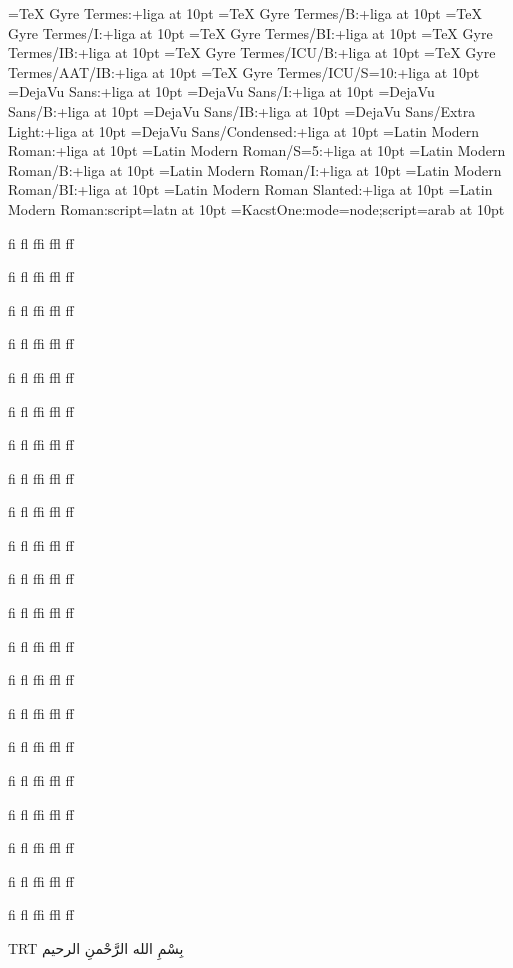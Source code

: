 

\font\termesr  ={TeX Gyre Termes:+liga}    at 10pt
\font\termesb  ={TeX Gyre Termes/B:+liga}  at 10pt
\font\termesi  ={TeX Gyre Termes/I:+liga}  at 10pt
\font\termesbi ={TeX Gyre Termes/BI:+liga} at 10pt
\font\termesib ={TeX Gyre Termes/IB:+liga} at 10pt
\font\termesicu={TeX Gyre Termes/ICU/B:+liga} at 10pt
\font\termesaat={TeX Gyre Termes/AAT/IB:+liga} at 10pt
\font\termess  ={TeX Gyre Termes/ICU/S=10:+liga} at 10pt
\font\dsans    ={DejaVu Sans:+liga} at 10pt
\font\dsansi   ={DejaVu Sans/I:+liga} at 10pt
\font\dsansb   ={DejaVu Sans/B:+liga} at 10pt
\font\dsansib  ={DejaVu Sans/IB:+liga} at 10pt
\font\dsansextr={DejaVu Sans/Extra Light:+liga} at 10pt
\font\dsansecnd={DejaVu Sans/Condensed:+liga} at 10pt
\font\lmr      ={Latin Modern Roman:+liga} at 10pt
\font\lmf      ={Latin Modern Roman/S=5:+liga} at 10pt
\font\lmb      ={Latin Modern Roman/B:+liga} at 10pt
\font\lmi      ={Latin Modern Roman/I:+liga} at 10pt
\font\lmbi     ={Latin Modern Roman/BI:+liga} at 10pt
\font\lms      ={Latin Modern Roman Slanted:+liga} at 10pt
\font\lmltn    ={Latin Modern Roman:script=latn} at 10pt
\font\arab     ={KacstOne:mode=node;script=arab} at 10pt

\termesr   fi fl ffi ffl ff\par
\termesb   fi fl ffi ffl ff\par
\termesi   fi fl ffi ffl ff\par
\termesbi  fi fl ffi ffl ff\par
\termesib  fi fl ffi ffl ff\par
\termesicu fi fl ffi ffl ff\par
\termesaat fi fl ffi ffl ff\par
\termess   fi fl ffi ffl ff\par
\dsans     fi fl ffi ffl ff\par
\dsansi    fi fl ffi ffl ff\par
\dsansb    fi fl ffi ffl ff\par
\dsansib   fi fl ffi ffl ff\par
\dsansextr fi fl ffi ffl ff\par
\dsansecnd fi fl ffi ffl ff\par
\lmr       fi fl ffi ffl ff\par
\lmf       fi fl ffi ffl ff\par
\lmb       fi fl ffi ffl ff\par
\lmi       fi fl ffi ffl ff\par
\lmbi      fi fl ffi ffl ff\par
\lms       fi fl ffi ffl ff\par
\lmltn     fi fl ffi ffl ff\par
\leavevmode\arab\luatextextdir TRT بِسْمِ الله الرَّحْمنِ الرحيم\par
\bye
